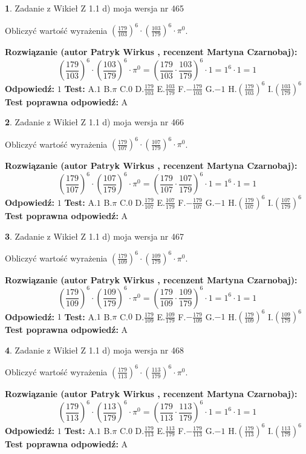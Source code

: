 \documentclass[12pt, a4paper]{article}
\theoremstyle{definition} %
\newtheorem{zad}{}
\newcommand{\zadStart}[1]{\begin{zad}#1\newline}
\newcommand{\zadStop}{\end{zad}}
\newcommand{\rozwStart}[2]{\noindent \textbf{Rozwiązanie (autor #1 , recenzent #2): }\newline}
\newcommand{\rozwStop}{\newline}
\newcommand{\odpStart}{\noindent \textbf{Odpowiedź:}\newline}
\newcommand{\odpStop}{\newline}
\newcommand{\testStart}{\noindent \textbf{Test:}\newline}
\newcommand{\testStop}{\newline}
\newcommand{\kluczStart}{\noindent \textbf{Test poprawna odpowiedź:}\newline}
\newcommand{\kluczStop}{\newline}
\begin{document}
\zadStart{Zadanie z Wikieł Z 1.1 d) moja wersja nr 465}

Obliczyć wartość wyrażenia $(\frac{179}{103})^{6} \cdot (\frac{103}{179})^{6} \cdot \pi^{0}$.
\zadStop
\rozwStart{Patryk Wirkus}{Martyna Czarnobaj}
$$(\frac{179}{103})^{6} \cdot (\frac{103}{179})^{6} \cdot \pi^{0} = (\frac{179}{103} \cdot \frac{103}{179})^{6} \cdot 1 = 1^{6} \cdot 1 = 1$$
\rozwStop
\odpStart
$1$
\odpStop
\testStart
A.$1$ B.$\pi$ C.$0$ D.$\frac{179}{103}$ E.$\frac{103}{179}$
F.$-\frac{179}{103}$ G.$-1$
H.$(\frac{179}{103})^{6}$
I.$(\frac{103}{179})^{6}$
\testStop
\kluczStart
A
\kluczStop



\zadStart{Zadanie z Wikieł Z 1.1 d) moja wersja nr 466}

Obliczyć wartość wyrażenia $(\frac{179}{107})^{6} \cdot (\frac{107}{179})^{6} \cdot \pi^{0}$.
\zadStop
\rozwStart{Patryk Wirkus}{Martyna Czarnobaj}
$$(\frac{179}{107})^{6} \cdot (\frac{107}{179})^{6} \cdot \pi^{0} = (\frac{179}{107} \cdot \frac{107}{179})^{6} \cdot 1 = 1^{6} \cdot 1 = 1$$
\rozwStop
\odpStart
$1$
\odpStop
\testStart
A.$1$ B.$\pi$ C.$0$ D.$\frac{179}{107}$ E.$\frac{107}{179}$
F.$-\frac{179}{107}$ G.$-1$
H.$(\frac{179}{107})^{6}$
I.$(\frac{107}{179})^{6}$
\testStop
\kluczStart
A
\kluczStop



\zadStart{Zadanie z Wikieł Z 1.1 d) moja wersja nr 467}

Obliczyć wartość wyrażenia $(\frac{179}{109})^{6} \cdot (\frac{109}{179})^{6} \cdot \pi^{0}$.
\zadStop
\rozwStart{Patryk Wirkus}{Martyna Czarnobaj}
$$(\frac{179}{109})^{6} \cdot (\frac{109}{179})^{6} \cdot \pi^{0} = (\frac{179}{109} \cdot \frac{109}{179})^{6} \cdot 1 = 1^{6} \cdot 1 = 1$$
\rozwStop
\odpStart
$1$
\odpStop
\testStart
A.$1$ B.$\pi$ C.$0$ D.$\frac{179}{109}$ E.$\frac{109}{179}$
F.$-\frac{179}{109}$ G.$-1$
H.$(\frac{179}{109})^{6}$
I.$(\frac{109}{179})^{6}$
\testStop
\kluczStart
A
\kluczStop



\zadStart{Zadanie z Wikieł Z 1.1 d) moja wersja nr 468}

Obliczyć wartość wyrażenia $(\frac{179}{113})^{6} \cdot (\frac{113}{179})^{6} \cdot \pi^{0}$.
\zadStop
\rozwStart{Patryk Wirkus}{Martyna Czarnobaj}
$$(\frac{179}{113})^{6} \cdot (\frac{113}{179})^{6} \cdot \pi^{0} = (\frac{179}{113} \cdot \frac{113}{179})^{6} \cdot 1 = 1^{6} \cdot 1 = 1$$
\rozwStop
\odpStart
$1$
\odpStop
\testStart
A.$1$ B.$\pi$ C.$0$ D.$\frac{179}{113}$ E.$\frac{113}{179}$
F.$-\frac{179}{113}$ G.$-1$
H.$(\frac{179}{113})^{6}$
I.$(\frac{113}{179})^{6}$
\testStop
\kluczStart
A
\kluczStop
\end{document}
